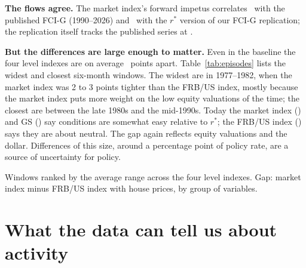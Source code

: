 \documentclass[11pt]{article}
\def\out{../replication/output}
\begin{document}
\textbf{The flows agree.} The market index's forward impetus correlates \NomFiPub\ with the published FCI-G (1990--2026) and \RstarFiFcig\ with the $r^*$ version of our FCI-G replication; the replication itself tracks the published series at \NomFcigPub.

\textbf{But the differences are large enough to matter.} Even in the baseline the four level indexes are on average \RstarRangeLong\ points apart. Table~\ref{tab:episodes} lists the widest and closest six-month windows. The widest are in 1977--1982, when the market index was 2 to 3 points tighter than the FRB/US index, mostly because the market index puts more weight on the low equity valuations of the time; the closest are between the late 1980s and the mid-1990s. Today the market index (\RstarMktLatest) and GS (\RstarGsLatest) say conditions are somewhat easy relative to $r^*$; the FRB/US index (\RstarFrbusLatest) says they are about neutral. The gap again reflects equity valuations and the dollar. Differences of this size, around a percentage point of policy rate, are a source of uncertainty for policy.

\begin{table}[H]\centering\small
\caption{Widest and closest six-month windows, $r^*$ baseline}\label{tab:episodes}
{\scriptsize\setlength{\tabcolsep}{3pt}}
\par\medskip\begin{minipage}{0.92\textwidth}\footnotesize Windows ranked by the average range across the four level indexes. Gap: market index minus FRB/US index with house prices, by group of variables.\end{minipage}
\end{table}

\section{What the data can tell us about activity}\label{sec:box}
\end{document}
